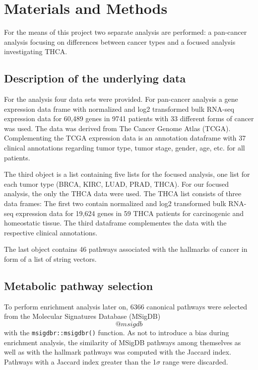 \documentclass[
  parskip,
  oneside]{scrreprt}
\begin{document}
\hypertarget{materials-and-methods}{%
\chapter{Materials and Methods}\label{materials-and-methods}}

For the means of this project two separate analysis are performed: a
pan-cancer analysis focusing on differences between cancer types and a
focused analysis investigating THCA.

\hypertarget{description-of-the-underlying-data}{%
\section{Description of the underlying
data}\label{description-of-the-underlying-data}}

For the analysis four data sets were provided. For pan-cancer analysis a
gene expression data frame with normalized and log2 transformed bulk
RNA-seq expression data for 60,489 genes in 9741 patients with 33
different forms of cancer was used. The data was derived from The Cancer
Genome Atlas (TCGA). Complementing the TCGA expression data is an
annotation dataframe with 37 clinical annotations regarding tumor type,
tumor stage, gender, age, etc. for all patients.

The third object is a list containing five lists for the focused
analysis, one list for each tumor type (BRCA, KIRC, LUAD, PRAD, THCA).
For our focused analysis, the only the THCA data were used. The THCA
list consists of three data frames: The first two contain normalized and
log2 transformed bulk RNA-seq expression data for 19,624 genes in 59
THCA patients for carcinogenic and homeostatic tissue. The third
dataframe complementes the data with the respective clinical
annotations.

The last object contains 46 pathways associated with the hallmarks of
cancer in form of a list of string vectors.

\hypertarget{metabolic-pathway-selection}{%
\section{Metabolic pathway
selection}\label{metabolic-pathway-selection}}

To perform enrichment analysis later on, 6366 canonical pathways were
selected from the Molecular Signatures Database (MSigDB)\[@msigdb\] with
the \texttt{msigdbr::msigdbr()} function. As not to introduce a bias
during enrichment analysis, the similarity of MSigDB pathways among
themselves as well as with the hallmark pathways was computed with the
Jaccard index. Pathways with a Jaccard index greater than the
1\(\sigma\) range were discarded.
\end{document}
